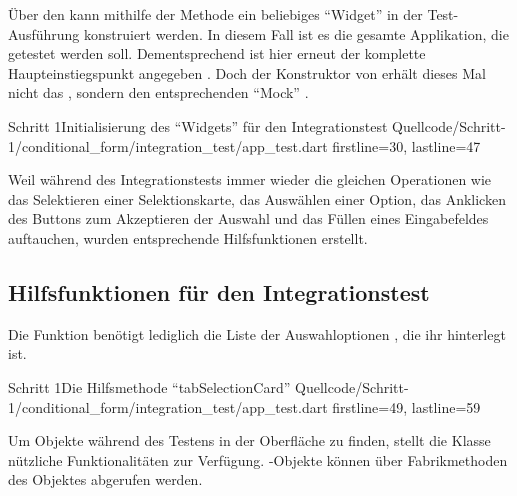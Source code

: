 \clearpage
Über den  kann mithilfe der Methode  ein beliebiges \enquote{Widget} in der Test-Ausführung konstruiert werden.
In diesem Fall ist es die gesamte Applikation, die getestet werden soll.
Dementsprechend ist  hier erneut der komplette Haupteinstiegspunkt angegeben \Lst{\ref{lst:Schritt1IntegrationsTestWidgetInitialisierung}}.
Doch der Konstruktor von  erhält dieses Mal nicht das , sondern den entsprechenden \enquote{Mock} . 

\begin{alexlisting}{Schritt 1}{Initialisierung des \enquote{Widgets} für den Integrationstest}
  {Quellcode/Schritt-1/conditional_form/integration_test/app_test.dart}
  {firstline=30, lastline=47}
  \label{lst:Schritt1IntegrationsTestWidgetInitialisierung}
\end{alexlisting}


Weil während des Integrationstests immer wieder die gleichen Operationen wie das Selektieren einer Selektionskarte,
das Auswählen einer Option,
das Anklicken des Buttons zum Akzeptieren der Auswahl und das Füllen eines Eingabefeldes auftauchen,
wurden entsprechende Hilfsfunktionen erstellt.

\subsection{Hilfsfunktionen für den Integrationstest}
\label{sec:HilfsfunktionenIntegrationstest}



Die Funktion  \Lst{\ref{lst:Schritt1HilfsmethodeTabSelectionCard}} benötigt lediglich die Liste der Auswahloptionen , die ihr hinterlegt ist.
 

\begin{alexlisting}{Schritt 1}{Die Hilfsmethode \enquote{tabSelectionCard}}
  {Quellcode/Schritt-1/conditional_form/integration_test/app_test.dart}
  {firstline=49, lastline=59}
  \label{lst:Schritt1HilfsmethodeTabSelectionCard}
\end{alexlisting}

Um Objekte während des Testens in der Oberfläche zu finden, stellt die Klasse  nützliche Funktionalitäten zur Verfügung.
-Objekte können über Fabrikmethoden des Objektes  abgerufen werden.


